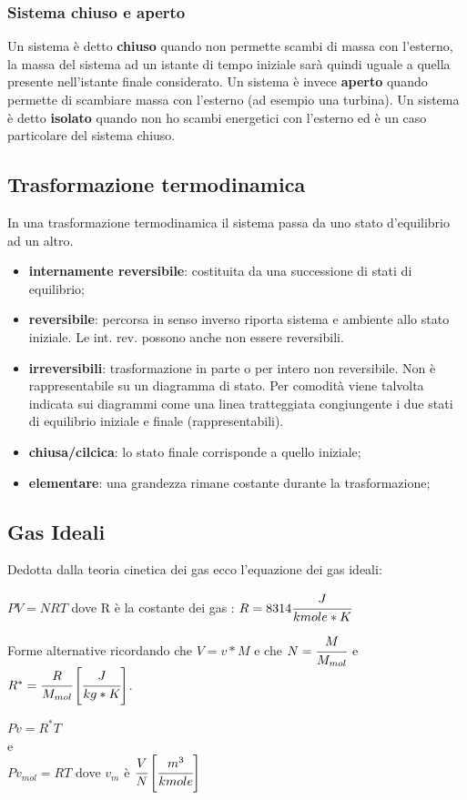 \documentclass[a4paper,12pt,titlepage]{article}
\begin{document}
\subsubsection{Sistema chiuso e aperto}
Un sistema è detto \textbf{chiuso} quando non permette scambi di massa con l'esterno, la massa del sistema ad un istante di tempo iniziale sarà quindi uguale a quella presente nell'istante finale considerato. Un sistema è invece \textbf{aperto} quando permette di scambiare massa con l'esterno (ad esempio una turbina). Un sistema è detto \textbf{isolato} quando non ho scambi energetici con l'esterno ed è un caso particolare del sistema chiuso.
\subsection{Trasformazione termodinamica}
In una trasformazione termodinamica il sistema passa da uno stato d'equilibrio ad un altro.
\begin{itemize}
\item \textbf{internamente reversibile}:
costituita da una successione di stati di equilibrio;
\item \textbf{reversibile}: percorsa in senso inverso riporta sistema e ambiente allo stato iniziale. Le int. rev. possono anche non essere reversibili. 
\item \textbf{irreversibili}: trasformazione in parte o per intero non reversibile. Non è rappresentabile su un diagramma di stato. Per comodità viene talvolta indicata sui diagrammi come una linea tratteggiata congiungente i due stati di equilibrio iniziale e finale (rappresentabili).
\item \textbf{chiusa/cilcica}: lo stato finale corrisponde a quello iniziale;
\item \textbf{elementare}: una grandezza rimane costante durante la trasformazione;
\end{itemize}

\subsection{Gas Ideali}

Dedotta dalla teoria cinetica dei gas ecco l'equazione dei gas ideali:
\begin{center}
$PV = NRT $ dove R è la costante dei gas : $R = 8314 \cfrac{J}{kmole * K}$
\end{center}
Forme alternative ricordando che $V = v*M$ e che $N = \cfrac{M}{M_{mol}}$
e \\ $R^{*} = \cfrac{R}{M_{mol}} \left[\cfrac{J}{kg*K}\right]$.\\
\begin{center}
$Pv = R^{*}T $\\ e \\
$Pv_{mol} = RT $ dove $v_{m}$ è $\cfrac{V}{N} \left[\cfrac{m^{3}}{kmole}\right]$
\end{center}
\end{document}

